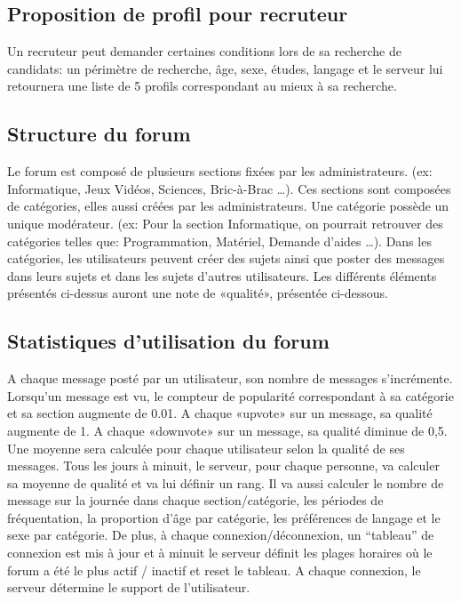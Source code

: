 \documentclass{report}
\begin{document}
\subsection{Proposition de profil pour recruteur}
		Un recruteur peut demander certaines conditions 	lors de sa recherche de candidats: un périmètre de 		recherche, âge, sexe, études, langage et le serveur lui 	retournera une liste de 5 profils correspondant au mieux à sa 	recherche.

\subsection{Structure du forum}
		Le forum est composé de plusieurs sections fixées 	par les administrateurs. (ex:  Informatique, Jeux Vidéos, 	Sciences, Bric-à-Brac …).
		Ces sections sont composées de catégories, elles 	aussi créées par les administrateurs. Une catégorie 		possède un unique modérateur. (ex: Pour la section 		Informatique, on pourrait retrouver des catégories telles 	que:  Programmation, Matériel, Demande d'aides …).
		Dans les catégories, les utilisateurs peuvent créer 	des sujets ainsi que poster des messages dans leurs 		sujets et dans les sujets d'autres utilisateurs.
		Les différents éléments présentés ci-dessus auront 	une note de «qualité», présentée ci-dessous.
\subsection{Statistiques d’utilisation du forum}
		A chaque message posté par un utilisateur, son nombre 	de messages s'incrémente.
		Lorsqu'un message est vu, le compteur de popularité 	correspondant à sa catégorie et sa section augmente de 0.01.
		A chaque «upvote» sur un message, sa qualité augmente 	de 1.
		A chaque «downvote» sur un message, sa qualité 	diminue de 0,5.
		Une moyenne sera calculée pour chaque utilisateur selon 	la qualité de ses messages.
		Tous les jours à minuit, le serveur, pour chaque 	personne, va calculer sa moyenne de qualité et va lui définir 	un rang.
		Il va aussi calculer le nombre de message sur la journée 	dans chaque section/catégorie, les périodes de fréquentation, 	la proportion d'âge par catégorie, les préférences de langage 	et le sexe par catégorie.
		De plus, à chaque connexion/déconnexion, un “tableau” 	de connexion est mis à jour et à minuit le serveur définit les 	plages horaires où le forum a été le plus actif / inactif et reset 	le tableau.
		A chaque connexion, le serveur détermine le support de 	l’utilisateur.
\end{document}

